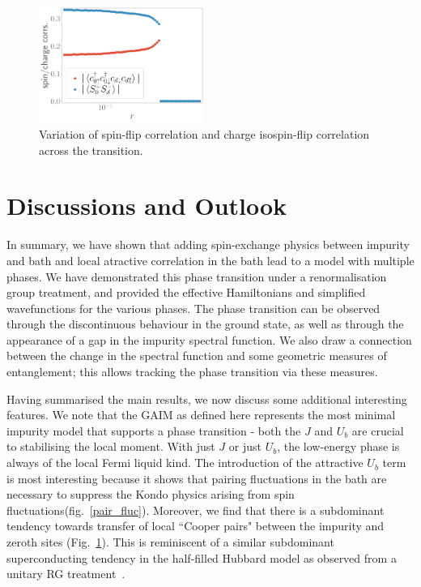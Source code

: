 \documentclass[reprint,superscriptaddress,floatfix]{revtex4-2}
\begin{document}
\begin{figure}[!htb]
	\centering
	\includegraphics[width=0.48\textwidth]{odlro_d0.pdf}
	\caption{Variation of spin-flip correlation and charge isospin-flip correlation across the transition.}
	\label{charge-spin}
\end{figure}

\section{Discussions and Outlook}
\label{concl}

In summary, we have shown that adding spin-exchange physics between impurity and bath and local atractive correlation in the bath lead to a model with multiple phases. We have demonstrated this phase transition under a renormalisation group treatment, and provided the effective Hamiltonians and simplified wavefunctions for the various phases. The phase transition can be observed through the discontinuous behaviour in the ground state, as well as through the appearance of a gap in the impurity spectral function. We also draw a connection between the change in the spectral function and some geometric measures of entanglement; this allows tracking the phase transition via these measures.

Having summarised the main results, we now discuss some additional interesting features. We note that the GAIM as defined here represents the most minimal impurity model that supports a phase transition - both the \(J\) and \(U_b\) are crucial to stabilising the local moment. With just \(J\) or just \(U_b\), the low-energy phase is always of the local Fermi liquid kind. The introduction of the attractive \(U_b\) term is most interesting because it shows that pairing fluctuations in the bath are necessary to suppress the Kondo physics arising from spin fluctuations(fig.~\ref{pair_fluc}). Moreover, we find that there is a subdominant tendency towards transfer of local ``Cooper pairs" between the impurity and zeroth sites (Fig.~\ref{charge-spin}). This is reminiscent of a similar subdominant superconducting tendency in the half-filled Hubbard model as observed from a unitary RG treatment~\cite{anirbanmott1,anirbanmott2}.
\end{document}
